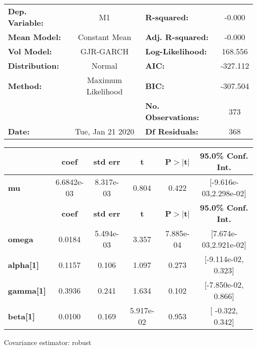 \begin{center}
\begin{tabular}{lclc}
\toprule
\textbf{Dep. Variable:} &         M1         & \textbf{  R-squared:         } &    -0.000   \\
\textbf{Mean Model:}    &   Constant Mean    & \textbf{  Adj. R-squared:    } &    -0.000   \\
\textbf{Vol Model:}     &     GJR-GARCH      & \textbf{  Log-Likelihood:    } &    168.556  \\
\textbf{Distribution:}  &       Normal       & \textbf{  AIC:               } &   -327.112  \\
\textbf{Method:}        & Maximum Likelihood & \textbf{  BIC:               } &   -307.504  \\
\textbf{}               &                    & \textbf{  No. Observations:  } &    373      \\
\textbf{Date:}          &  Tue, Jan 21 2020  & \textbf{  Df Residuals:      } &    368      \\
\bottomrule
\end{tabular}
\begin{tabular}{lccccc}
            & \textbf{coef} & \textbf{std err} & \textbf{t} & \textbf{P$>$$|$t$|$} & \textbf{95.0\% Conf. Int.}  \\
\midrule
\textbf{mu} &   6.6842e-03  &    8.317e-03     &     0.804  &          0.422       &   [-9.616e-03,2.298e-02]    \\
                  & \textbf{coef} & \textbf{std err} & \textbf{t} & \textbf{P$>$$|$t$|$} & \textbf{95.0\% Conf. Int.}  \\
\midrule
\textbf{omega}    &       0.0184  &    5.494e-03     &     3.357  &      7.885e-04       &   [7.674e-03,2.921e-02]     \\
\textbf{alpha[1]} &       0.1157  &        0.106     &     1.097  &          0.273       &    [-9.114e-02,  0.323]     \\
\textbf{gamma[1]} &       0.3936  &        0.241     &     1.634  &          0.102       &    [-7.850e-02,  0.866]     \\
\textbf{beta[1]}  &       0.0100  &        0.169     & 5.917e-02  &          0.953       &     [ -0.322,  0.342]       \\
\bottomrule
\end{tabular}
\end{center}

Covariance estimator: robust